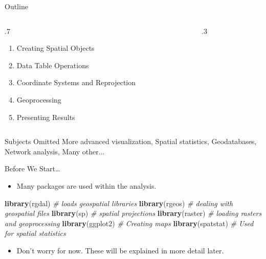\documentclass[10pt,ignorenonframetext,]{beamer}
\newenvironment{Shaded}{\begin{snugshade}}{\end{snugshade}}
\newcommand{\KeywordTok}[1]{\textcolor[rgb]{0.13,0.29,0.53}{\textbf{{#1}}}}
\newcommand{\CommentTok}[1]{\textcolor[rgb]{0.56,0.35,0.01}{\textit{{#1}}}}
\newcommand{\NormalTok}[1]{{#1}}
\providecommand{\tightlist}{%
  \setlength{\itemsep}{0pt}\setlength{\parskip}{0pt}}
\def\begincols{\begin{columns}}
\def\begincol{\begin{column}}
\def\endcol{\end{column}}
\def\endcols{\end{columns}}
\begin{document}
\begin{frame}{Outline}

\begincols
\begincol{.7\textwidth}

\begin{enumerate}
\def\labelenumi{\arabic{enumi}.}
\tightlist
\item
  Creating Spatial Objects
\item
  Data Table Operations
\item
  Coordinate Systems and Reprojection
\item
  Geoprocessing
\item
  Presenting Results
\end{enumerate}

\endcol
\begincol{.3\textwidth}

\endcol
\endcols

\begin{alertblock}{Subjects Omitted}
More advanced visualization, Spatial statistics, Geodatabases, Network analysis, Many other...
\end{alertblock}

\end{frame}

\begin{frame}[fragile]{Before We Start\ldots{}}

\begin{itemize}
\tightlist
\item
  Many packages are used within the analysis.
\end{itemize}

\begin{Shaded}
\begin{Highlighting}[]
\KeywordTok{library}\NormalTok{(rgdal)  }\CommentTok{# loads geospatial libraries}
\KeywordTok{library}\NormalTok{(rgeos)  }\CommentTok{# dealing with geospatial files}
\KeywordTok{library}\NormalTok{(sp)  }\CommentTok{# spatial projections}
\KeywordTok{library}\NormalTok{(raster)  }\CommentTok{# loading rasters and geoprocessing}
\KeywordTok{library}\NormalTok{(ggplot2)  }\CommentTok{# Creating maps}
\KeywordTok{library}\NormalTok{(spatstat)  }\CommentTok{# Used for spatial statistics}
\end{Highlighting}
\end{Shaded}

\begin{itemize}
\tightlist
\item
  Don't worry for now. These will be explained in more detail later.
\end{itemize}

\end{frame}
\end{document}
